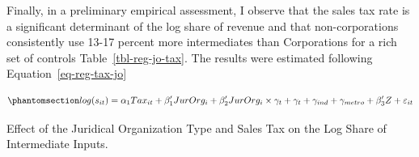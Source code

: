 \documentclass[
  12pt]{article}
\theoremstyle{definition}
\theoremstyle{remark}
\begin{document}
Finally, in a preliminary empirical assessment, I observe that the sales
tax rate is a significant determinant of the log share of revenue and
that non-corporations consistently use 13-17 percent more intermediates
than Corporations for a rich set of controls Table~\ref{tbl-reg-jo-tax}.
The results were estimated following Equation~\ref{eq-reg-tax-jo}

\begin{equation}\phantomsection\label{eq-reg-tax-jo}{
log(s_{it})= \alpha_1Tax_{it}+\beta_1'JurOrg_i + \beta_2'JurOrg_i\times\gamma_t+ \gamma_t + \gamma_{ind} +\gamma_{metro} + \beta_3'Z+ \varepsilon_{it}
}\end{equation}

\begin{table}

\caption{\label{tbl-reg-jo-tax}Effect of the Juridical Organization Type
and Sales Tax on the Log Share of Intermediate Inputs.}

\begin{minipage}{\linewidth}


\end{minipage}
\end{table}
\end{document}
